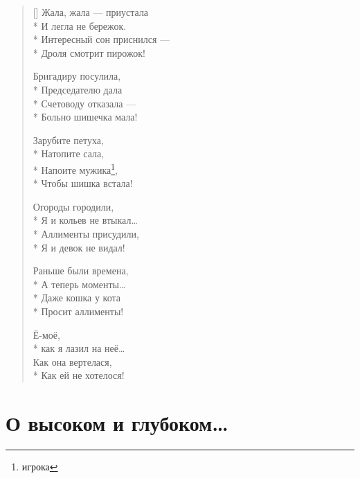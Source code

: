 \documentclass[a4paper,oneside,14pt]{scrbook}
\begin{document}
\begin{verse}[\versewidth]
        Жала, жала --- приустала\\*
        И легла не бережок.\\*
        Интересный сон приснился --- \\*
        Дроля смотрит пирожок!
        
        Бригадиру посулила,\\*
        Председателю дала\\*
        Счетоводу отказала --- \\*
        Больно шишечка мала!

        Зарубите петуха,\\*
        Натопите сала,\\*
        Напоите мужика\footnote{игрока},\\*
        Чтобы шишка встала!
        
        Огороды городили,\\*
        Я и кольев не втыкал\ldots\\*
        Аллименты присудили,\\*
        Я и девок не видал!
        
        Раньше были времена,\\*
        А теперь моменты\ldots\\*
        Даже кошка у кота\\*
        Просит аллименты!
        
        Ё-моё,\\*
        как я лазил на неё\ldots\\
        Как она вертелася,\\*
        Как ей не хотелося!
    \end{verse}    

    
    \section{О высоком и глубоком\ldots}
    
\end{document}
